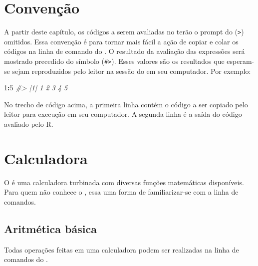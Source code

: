 \documentclass[]{book}
\newenvironment{Shaded}{\begin{snugshade}}{\end{snugshade}}
\newcommand{\DecValTok}[1]{\textcolor[rgb]{0.00,0.00,0.81}{#1}}
\newcommand{\FloatTok}[1]{\textcolor[rgb]{0.00,0.00,0.81}{#1}}
\newcommand{\StringTok}[1]{\textcolor[rgb]{0.31,0.60,0.02}{#1}}
\newcommand{\CommentTok}[1]{\textcolor[rgb]{0.56,0.35,0.01}{\textit{#1}}}
\newcommand{\OperatorTok}[1]{\textcolor[rgb]{0.81,0.36,0.00}{\textbf{#1}}}
\newcommand{\NormalTok}[1]{#1}
\begin{document}
\section{Convenção}\label{convencao}

A partir deste capítulo, os códigos a serem avaliadas no terão o prompt
do (\texttt{\textgreater{}}) omitidos. Essa convenção é para tornar mais
fácil a ação de copiar e colar os códigos na linha de comando do . O
resultado da avaliação das expressões será mostrado precedido do símbolo
(\texttt{\#\textgreater{}}). Esses valores são os resultados que
esperam-se sejam reproduzidos pelo leitor na sessão do em seu
computador. Por exemplo:

\begin{Shaded}
\begin{Highlighting}[]
\DecValTok{1}\OperatorTok{:}\DecValTok{5}
\CommentTok{#> [1] 1 2 3 4 5}
\end{Highlighting}
\end{Shaded}

No trecho de código acima, a primeira linha contém o código a ser
copiado pelo leitor para execução em seu computador. A segunda linha é a
saída do código avaliado pelo R.

\section{Calculadora}\label{calculadora}

O é uma calculadora turbinada com diversas funções matemáticas
disponíveis. Para quem não conhece o , essa uma forma de familiarizar-se
com a linha de comandos.

\subsection{Aritmética básica}\label{aritmetica-basica}

Todas operações feitas em uma calculadora podem ser realizadas na linha
de comandos do .

\begin{Shaded}
\end{Shaded}
\end{document}
